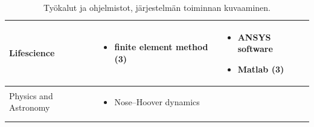 \documentclass[utf8]{gradu3}
\begin{document}
\begin{longtable}[h]{|p{4cm}|p{6cm}|p{5cm}|}
    \\
    \hline
    Lifescience & \begin{itemize}
        \item finite element method (3)
    \end{itemize} &
    \begin{itemize}
        \item ANSYS software
        \item Matlab (3)
    \end{itemize}
    \\
    \hline
    Physics and Astronomy & \begin{itemize}
        \item Nose–Hoover dynamics
    \end{itemize} &
    
    \\
    \hline
    \caption{Työkalut ja ohjelmistot, järjestelmän toiminnan kuvaaminen.}
    \label{table:mallintaminen 1.}
\end{longtable}

\pagebreak
\end{document}
